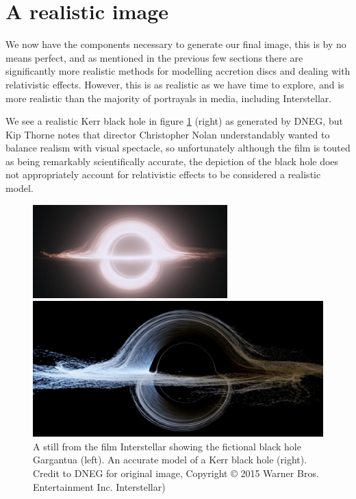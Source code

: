 \documentclass[oneside,openright,frontopenright, singlespacing]{dmathesis}
\begin{document}
\section{A realistic image}\label{sec:Section5.3}

	We now have the components necessary to generate our final image, this is by no means perfect, and as mentioned in the previous few sections there are significantly more realistic methods for modelling accretion discs and dealing with relativistic effects. However, this is as realistic as we have time to explore, and is more realistic than the majority of portrayals in media, including Interstellar. 

\vspace{1em}
	We see a realistic Kerr black hole in figure \ref{fig:Figure5.4} (right) as generated by DNEG\cite{thorne2015gravitational}, but Kip Thorne notes that director Christopher Nolan understandably wanted to balance realism with visual spectacle, so unfortunately although the film is touted as being remarkably scientifically accurate, the depiction of the black hole does not appropriately account for relativistic effects to be considered a realistic model.

\begin{figure}[!ht]
	\centering
	\begin{minipage}{0.5\textwidth}
		\centering
		\includegraphics[width=0.9\linewidth]{img/used-kerr}
	\end{minipage}%
	\hfill
	\begin{minipage}{0.5\textwidth}
		\centering
		\includegraphics[width=0.9\linewidth]{img/realistic-kerr}
	\end{minipage}
	\caption{A still from the film Interstellar showing the fictional black hole Gargantua (left). An accurate model of a Kerr black hole (right). Credit to DNEG for original image, Copyright ©  2015 Warner Bros. Entertainment Inc. Interstellar)}
	\label{fig:Figure5.4}
\end{figure}
\end{document}
